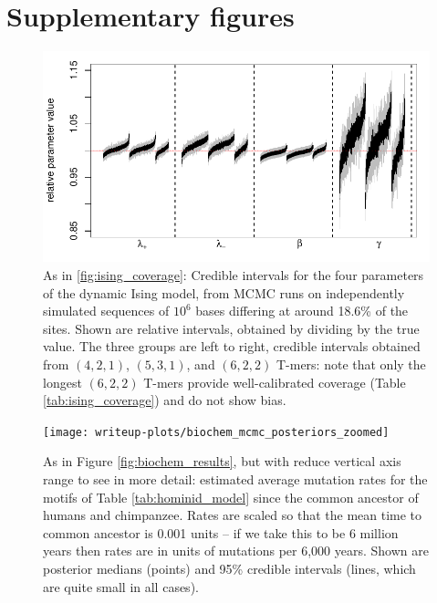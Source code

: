 \documentclass{article}
\theoremstyle{plain}
\theoremstyle{definition}
\begin{document}



\appendix

\section{Supplementary figures}

\begin{figure}
    \begin{center}
        \includegraphics{writeup-plots/coverage_results_all}
    \end{center}
    \caption{
        As in \ref{fig:ising_coverage}:
        Credible intervals for the four parameters of the dynamic Ising model,
        from MCMC runs on independently simulated sequences of $10^6$ bases
        differing at around 18.6\% of the sites.
        Shown are relative intervals, obtained by dividing by the true value.
        The three groups are left to right, credible intervals obtained from $(4,2,1)$, $(5,3,1)$, and $(6,2,2)$ T-mers:
        note that only the longest $(6,2,2)$ T-mers provide well-calibrated coverage (Table \ref{tab:ising_coverage})
        and do not show bias.
        \label{fig:all_ising_coverage}}
\end{figure}

\begin{figure}
    \begin{center}
        \texttt{[image: writeup-plots/biochem\_mcmc\_posteriors\_zoomed]}
    \end{center}
    \caption{
        As in Figure \ref{fig:biochem_results}, but with reduce vertical axis range
        to see in more detail:
        estimated average mutation rates
        for the motifs of Table \ref{tab:hominid_model}
        since the common ancestor of humans and chimpanzee.
        Rates are scaled so that the mean time to common ancestor is 0.001 units --
        if we take this to be 6 million years \citep{scally2012insights}
        then rates are in units of mutations per 6,000 years.
        Shown are posterior medians (points) and 95\% credible intervals (lines, which are quite small in all cases).
        \label{sfig:biochem_results_zoom}}
\end{figure}
\end{document}
